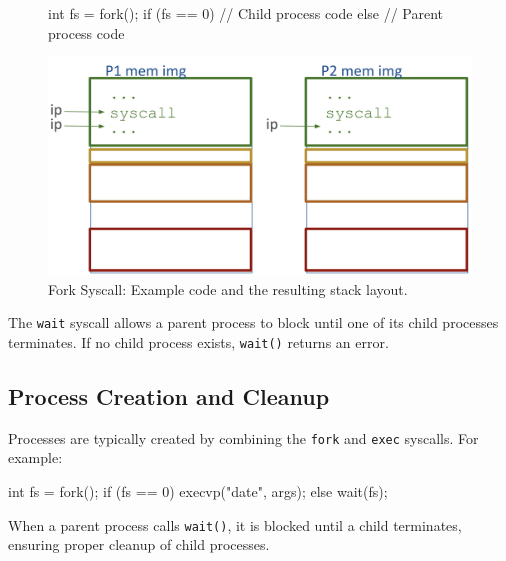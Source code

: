 \documentclass[../../compsys.tex]{subfiles}
\begin{document}
\begin{figure}[htp]
  \centering
  \begin{minipage}[b]{0.45\textwidth}
    \begin{cc}
int fs = fork();
if (fs == 0) {
   // Child process code
} else {
   // Parent process code
}




    \end{cc}
  \end{minipage}
  \hfill
  \vline
  \hfill
  \begin{minipage}[b]{0.45\textwidth}
    \centering
    \includegraphics[width=1.25\textwidth]{chapters/L3/images/fork.png}
  \end{minipage}
  \caption{Fork Syscall: Example code and the resulting stack layout.}
\end{figure}

\begin{definition}
The \texttt{wait} syscall allows a parent process to block until one of its child processes terminates. If no child process exists, \texttt{wait()} returns an error.
\end{definition}

\subsection{Process Creation and Cleanup}

Processes are typically created by combining the \texttt{fork} and \texttt{exec} syscalls. For example:
\begin{cc}
int fs = fork();
if (fs == 0) {
   execvp("date", args);
} else {
   wait(fs);
}
\end{cc}

When a parent process calls \texttt{wait()}, it is blocked until a child terminates, ensuring proper cleanup of child processes.
\newpage
\end{document}
